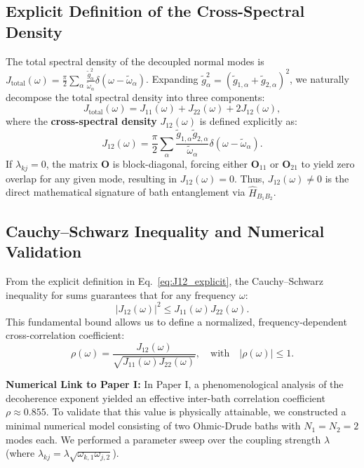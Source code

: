 \subsection{Explicit Definition of the Cross-Spectral Density}
The total spectral density of the decoupled normal modes is $J_{\text{total}}(\omega) = \frac{\pi}{2} \sum_\alpha \frac{\tilde{g}_\alpha^2}{\tilde{\omega}_\alpha} \delta(\omega - \tilde{\omega}_\alpha)$. Expanding $\tilde{g}_\alpha^2 = (\tilde{g}_{1,\alpha} + \tilde{g}_{2,\alpha})^2$, we naturally decompose the total spectral density into three components:
\begin{equation}
J_{\text{total}}(\omega) = J_{11}(\omega) + J_{22}(\omega) + 2 J_{12}(\omega),
\label{eq:J_total_split}
\end{equation}
where the \textbf{cross-spectral density} $J_{12}(\omega)$ is defined explicitly as:
\begin{equation}
J_{12}(\omega) = \frac{\pi}{2} \sum_{\alpha} \frac{\tilde{g}_{1,\alpha} \tilde{g}_{2,\alpha}}{\tilde{\omega}_\alpha} \delta(\omega - \tilde{\omega}_\alpha).
\label{eq:J12_explicit}
\end{equation}
If $\lambda_{kj} = 0$, the matrix $\mathbf{O}$ is block-diagonal, forcing either $\mathbf{O}_{11}$ or $\mathbf{O}_{21}$ to yield zero overlap for any given mode, resulting in $J_{12}(\omega) = 0$. Thus, $J_{12}(\omega) \neq 0$ is the direct mathematical signature of bath entanglement via $\hat{H}_{B_1 B_2}$.

\subsection{Cauchy--Schwarz Inequality and Numerical Validation}
From the explicit definition in Eq.~\eqref{eq:J12_explicit}, the Cauchy--Schwarz inequality for sums guarantees that for any frequency $\omega$:
\begin{equation}
|J_{12}(\omega)|^2 \leq J_{11}(\omega) J_{22}(\omega).
\label{eq:cauchy_schwarz}
\end{equation}
This fundamental bound allows us to define a normalized, frequency-dependent cross-correlation coefficient:
\begin{equation}
\rho(\omega) = \frac{J_{12}(\omega)}{\sqrt{J_{11}(\omega) J_{22}(\omega)}}, \quad \text{with} \quad |\rho(\omega)| \leq 1.
\label{eq:rho_def}
\end{equation}

\textbf{Numerical Link to Paper I:} In Paper I, a phenomenological analysis of the decoherence exponent yielded an effective inter-bath correlation coefficient $\rho \approx 0.855$. To validate that this value is physically attainable, we constructed a minimal numerical model consisting of two Ohmic-Drude baths with $N_1 = N_2 = 2$ modes each. We performed a parameter sweep over the coupling strength $\lambda$ (where $\lambda_{kj} = \lambda \sqrt{\omega_{k,1} \omega_{j,2}}$). 

